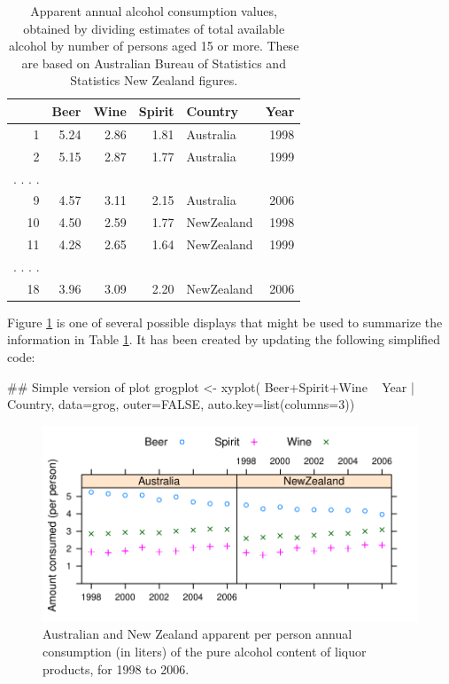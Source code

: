 \begin{table}
\begin{center}
\caption{Apparent annual alcohol consumption values, obtained by dividing
    estimates of total available alcohol by number of persons aged 15
    or more. These are based on Australian Bureau of Statistics
    and Statistics New Zealand figures.\label{tab:grog}}
\begin{tabular}{rrrrlr}
  \hline
 & Beer & Wine & Spirit & Country & Year \\
  \hline
1 & 5.24 & 2.86 & 1.81 & Australia & 1998 \\
  2 & 5.15 & 2.87 & 1.77 & Australia & 1999 \\
. . . .\\
  9 & 4.57 & 3.11 & 2.15 & Australia & 2006 \\
  10 & 4.50 & 2.59 & 1.77 & NewZealand & 1998 \\
  11 & 4.28 & 2.65 & 1.64 & NewZealand & 1999 \\
. . . .\\
  18 & 3.96 & 3.09 & 2.20 & NewZealand & 2006 \\
   \hline
\end{tabular}
\end{center}
\end{table}

Figure \ref{fig:allgrog} is one of several possible displays that
might be used to summarize the information in Table \ref{tab:grog}.
It has been created by updating the following simplified code:
\noindent
\begin{Schunk}
\begin{Sinput}
## Simple version of plot
grogplot <- xyplot(
              Beer+Spirit+Wine ~ Year | Country,
              data=grog, outer=FALSE,
              auto.key=list(columns=3))
\end{Sinput}
\end{Schunk}


\begin{figure}
\begin{Schunk}


\centerline{\includegraphics[width=\textwidth]{figs/07-grog-all-1} }

\end{Schunk}
\caption{Australian and New Zealand apparent per person annual
  consumption (in liters) of the pure alcohol content of liquor products, for
  1998 to 2006.\label{fig:allgrog}}
\end{figure}

